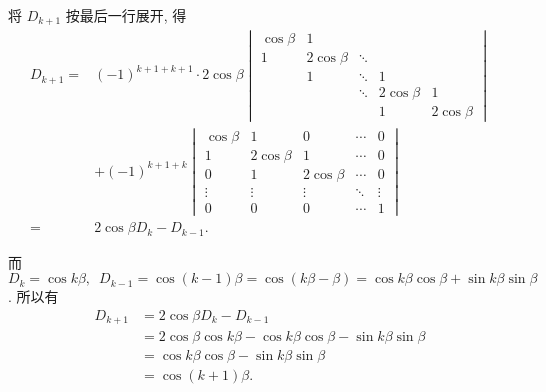\begin{solution}
\begin{enumerate}
            将 $D_{k+1}$ 按最后一行展开, 得
            \begin{align*}
                D_{k+1}={} & (-1)^{k+1+k+1} \cdot 2 \cos \beta
                \begin{vmatrix}
                    \cos \beta & 1            &        &              &              \\
                    1          & 2 \cos \beta & \ddots &              &              \\
                                & 1            & \ddots & 1            &              \\
                                &              & \ddots & 2 \cos \beta & 1            \\
                                &              &        & 1            & 2 \cos \beta
                \end{vmatrix} \\
                            & +(-1)^{k+1+k}
                \begin{vmatrix}
                    \cos \beta & 1            & 0            & \cdots & 0      \\
                    1          & 2 \cos \beta & 1            & \cdots & 0      \\
                    0          & 1            & 2 \cos \beta & \cdots & 0      \\
                    \vdots     & \vdots       & \vdots       & \ddots & \vdots \\
                    0          & 0            & 0            & \cdots & 1
                \end{vmatrix}       \\
                ={}        & 2\cos\beta D_k-D_{k-1}.
            \end{align*}

            而$D_{k}=\cos k \beta,\enspace
                D_{k-1}=\cos (k-1)\beta = \cos (k \beta-\beta) = \cos k \beta \cos \beta+\sin k \beta \sin \beta$. 所以有
            \begin{align*}
                D_{k+1} & = 2 \cos \beta D_{k}-D_{k-1}                                               \\
                        & =2 \cos \beta \cos k \beta-\cos k \beta \cos \beta-\sin k \beta \sin \beta \\
                        & =\cos k \beta \cos \beta-\sin k \beta \sin \beta                           \\
                        & =\cos (k+1) \beta.
            \end{align*}


\end{enumerate}
\end{solution}
